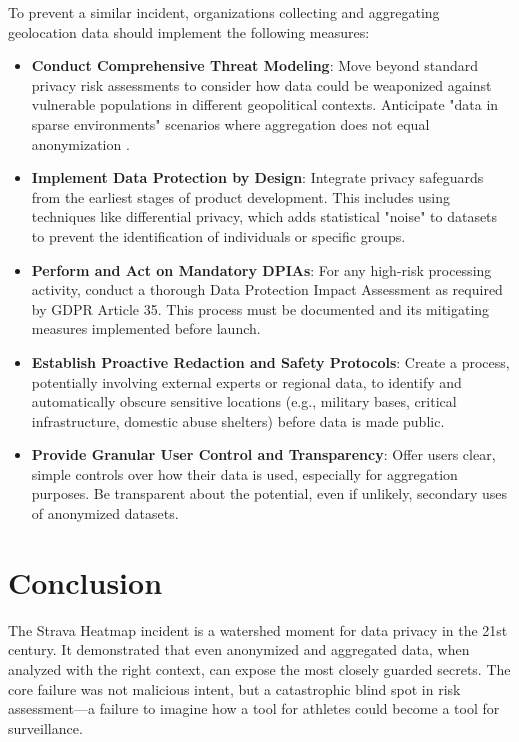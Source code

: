 \documentclass{article}
\begin{document}
     To prevent a similar incident, organizations collecting and aggregating geolocation data should implement the following measures:
\begin{itemize}
\item \textbf{Conduct Comprehensive Threat Modeling}: Move beyond standard privacy risk assessments to consider how data could be weaponized against vulnerable populations in different geopolitical contexts. Anticipate "data in sparse environments" scenarios where aggregation does not equal anonymization .

\item \textbf{Implement Data Protection by Design}: Integrate privacy safeguards from the earliest stages of product development. This includes using techniques like differential privacy, which adds statistical "noise" to datasets to prevent the identification of individuals or specific groups.

\item \textbf{Perform and Act on Mandatory DPIAs}: For any high-risk processing activity, conduct a thorough Data Protection Impact Assessment as required by GDPR Article 35. This process must be documented and its mitigating measures implemented before launch.

\item \textbf{ Establish Proactive Redaction and Safety Protocols}: Create a process, potentially involving external experts or regional data, to identify and automatically obscure sensitive locations (e.g., military bases, critical infrastructure, domestic abuse shelters) before data is made public.

\item \textbf{Provide Granular User Control and Transparency}: Offer users clear, simple controls over how their data is used, especially for aggregation purposes. Be transparent about the potential, even if unlikely, secondary uses of anonymized datasets.
\end{itemize}
\section{Conclusion}
The Strava Heatmap incident is a watershed moment for data privacy in the 21st century. It demonstrated that even anonymized and aggregated data, when analyzed with the right context, can expose the most closely guarded secrets. The core failure was not malicious intent, but a catastrophic blind spot in risk assessment—a failure to imagine how a tool for athletes could become a tool for surveillance.
\end{document}
